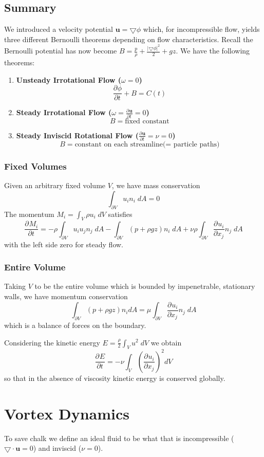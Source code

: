 \documentclass[11pt]{article}
\newcommand*{\pd}[3][]{\ensuremath{\frac{\partial^{#1} {#2}}{\partial {#3}^{#1}}}}
\newcommand{\grad}{\bigtriangledown}
\newcommand{\mv}[1]{\bm{#1}}
\newcommand{\mdf}[1]{{\color{red}#1}}
\newcommand{\abs}[1]{\left|#1\right|}
\begin{document}
\subsection{Summary}
We introduced a velocity potential $\mv{u}=\grad\phi$ which, for incompressible flow, yields three different Bernoulli theorems depending on flow characteristics. Recall the \mdf{Bernoulli potential} has now become $B=\frac{p}{\rho}+\frac{\abs{\grad\phi}^2}{2}+gz$.
We have the following theorems:
\begin{enumerate}
	\item \textbf{Unsteady Irrotational Flow ($\omega=0$)}
		$$\pd{\phi}{t}+B=C(t)$$
	\item \textbf{Steady Irrotational Flow ($\omega=\pd{\mv{u}}{t}=0$)}
		$$B=\text{fixed constant}$$
	\item \textbf{Steady Inviscid Rotational Flow ($\pd{\mv{u}}{t}=\nu=0$)}
		$$B=\text{constant on each streamline(= particle paths)}$$
\end{enumerate}
\subsubsection{Fixed Volumes}
Given an arbitrary fixed volume $V$, we have mass conservation
$$\int_{\partial V}u_in_i\;dA=0$$
The \mdf{momentum} $M_i=\int_V \rho u_i\;dV$ satisfies
$$\pd{M_i}{t}=-\rho\int_{\partial V}u_iu_jn_j\;dA-\int_{\partial V}(p+\rho gz)n_i\;dA+\nu\rho\int_{\partial V}\pd{u_i}{x_j}n_j\;dA$$
with the left side zero for steady flow.
\subsubsection{Entire Volume}
Taking $V$ to be the entire volume which is bounded by impenetrable, stationary walls, we have momentum conservation
$$\int_{\partial V}(p+\rho gz)n_idA = \mu\int_{\partial V}\pd{u_i}{x_j}n_j\;dA$$
which is a balance of forces on the boundary.

Considering the \mdf{kinetic energy} $E=\frac{\rho}{2}\int_V u^2\;dV$ we obtain
$$\pd{E}{t}=-\nu\int_V \left(\pd{u_i}{x_j}\right)^2dV$$
so that in the absence of viscosity kinetic energy is conserved globally.

\section{Vortex Dynamics}
To save chalk we define an \mdf{ideal fluid} to be what that is incompressible ($\grad\cdot\mv{u}=0$) and inviscid ($\nu=0$).
\end{document}
